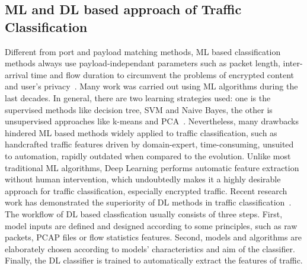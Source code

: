 \documentclass[conference]{IEEEtran}
\begin{document}
\subsection{ML and DL based approach of Traffic Classification}
Different from port and payload matching methods, ML based classification methods always use payload-independant parameters such as packet length, inter-arrival time and flow duration to circumvent the problems of encrypted content and user's privacy~\cite{2007legal}. Many work was carried out using ML algorithms during the last decades. In general, there are two learning strategies used: one is the supervised methods like decision tree, SVM and Naive Bayes, the other is unsupervised approaches like k-means and PCA~\cite{2008NguyenTC}. Nevertheless,  many drawbacks hindered ML based methods widely applied to traffic classification, such as handcrafted traffic features driven by domain-expert, time-consuming, unsuited to automation, rapidly outdated when compared to the evolution. Unlike most traditional ML algorithms, Deep Learning performs automatic feature extraction without human intervention, which undoubtedly makes it a highly desirable approach for traffic classification, especially encrypted traffic.  Recent research work has demonstrated the superiority of DL methods in traffic classification~\cite{MobileTC-2018,deeppacket,Datanet,Wang-1D-CNN,Wang2D-CNN,IoT-CNN-2017,HAST-IDS,Seq2Img,blackhat,TC-VAE,HierarchicalTC}. The workflow of DL based classfication usually consists of three steps. First, model inputs are defined and designed according to some principles, such as raw packets, PCAP files or flow statistics features. Second, models and algorithms are elaborately chosen according to models' characteristics and aim of the classifier. Finally, the DL classifier is trained to automatically extract the features of traffic.
\end{document}
